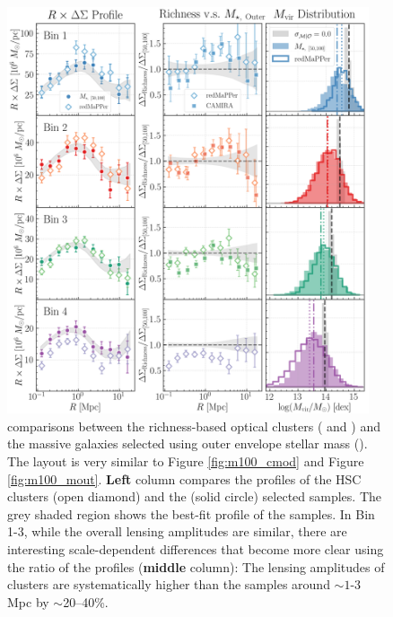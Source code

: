\documentclass[fleqn,usenatbib,useAMS]{mnras}
\begin{document}
\begin{figure}
    \centering
    \includegraphics[width=0.95\textwidth]{figure/fig_9}
    \caption{
        \topn{} comparisons between the richness-based optical clusters (\redm{} and \camira{})
        and the massive galaxies selected using outer envelope stellar mass ().
        The layout is very similar to Figure \ref{fig:m100_cmod} and Figure \ref{fig:m100_mout}.
        \textbf{Left} column compares the \rdsigma{} profiles of the HSC \redm{} clusters
        (open diamond) and the  (solid circle) selected samples.
        The grey shaded region shows the best-fit profile of the  samples.
        In Bin 1-3, while the overall lensing amplitudes are similar, there are interesting
        scale-dependent differences that become more clear using the ratio of the \dsigma{}
        profiles (\textbf{middle} column):
        The lensing amplitudes of \redm{} clusters are systematically higher than the
         samples around $\sim 1$-3 Mpc by $\sim$20--40\%.
}
\end{figure}
\end{document}
